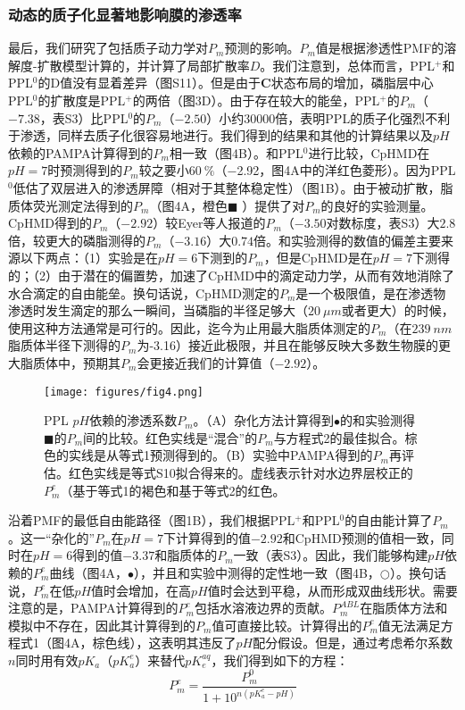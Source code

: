 \documentclass[journal=,manuscript=artical,email=false]{achemso}
\begin{document}
\subsubsection{动态的质子化显著地影响膜的渗透率}
最后，我们研究了包括质子动力学对$P_m$预测的影响。$P_m$值是根据渗透性PMF的溶解度-扩散模型计算的，并计算了局部扩散率$D$。我们注意到，总体而言，PPL$^{+}$和PPL$^{0}$的D值没有显着差异（图S11）。但是由于\textbf{C}状态布局的增加，磷脂层中心PPL$^{0}$的扩散度是PPL$^{+}$的两倍（图3D）。由于存在较大的能垒，PPL$^{+}$的$P_m$（$−7.38$，表S3）比PPL$^{0}$的$P_m$（$−2.50$）小约$30000$倍，表明PPL的质子化强烈不利于渗透，同样去质子化很容易地进行。我们得到的结果和其他的计算结果以及$pH$依赖的PAMPA计算得到的$P_m$相一致（图4B）。和PPL$^{0}$进行比较，CpHMD在$pH=7$时预测得到的$P_m$较之要小$60 ~\%$（−2.92，图4A中的洋红色菱形）。因为PPL$^{0}$低估了双层进入的渗透屏障（相对于其整体稳定性）（图1B）。由于被动扩散，脂质体荧光测定法得到的$P_m$（图4A，橙色$\blacksquare$ ）提供了对$P_m$的良好的实验测量。CpHMD得到的$P_m$（$-2.92$）较Eyer等人报道的$P_m$（$-3.50 对数标度$，表S3）大$2.8$倍，较更大的磷脂测得的$P_m$（$-3.16$）大$0.74$倍。和实验测得的数值的偏差主要来源以下两点：（1）实验是在$pH=6$下测到的$P_m$，但是CpHMD是在$pH=7$下测得的；（2）由于潜在的偏置势，加速了CpHMD中的滴定动力学，从而有效地消除了水合滴定的自由能垒。换句话说，CpHMD测定的$P_m$是一个极限值，是在渗透物渗透时发生滴定的那么一瞬间，当磷脂的半径足够大（$20~\mu m或者更大$）的时候，使用这种方法通常是可行的。因此，迄今为止用最大脂质体测定的$P_m$（在$239~nm$脂质体半径下测得的$P_m$为-3.16）接近此极限，并且在能够反映大多数生物膜的更大脂质体中，预期其$P_m$会更接近我们的计算值（$-2.92$）。

\begin{figure}[h]
\centering
\texttt{[image: figures/fig4.png]}
\caption{PPL $pH$依赖的渗透系数$P_m$。（A）杂化方法计算得到$\bullet$的和实验测得$\blacksquare$的$P_m$间的比较。红色实线是“混合”的$P_m$与方程式2的最佳拟合。棕色的实线是从等式1预测得到的。（B）实验中PAMPA得到的$P_m$再评估。红色实线是等式S10拟合得来的。虚线表示针对水边界层校正的$P^{e}_{m}$（基于等式1的褐色和基于等式2的红色。}
\label{fig:fig4}
\end{figure}


沿着PMF的最低自由能路径（图1B），我们根据PPL$^{+}$和PPL$^{0}$的自由能计算了$P_m$。这一“杂化的”$P_m$在$pH=7$下计算得到的值$-2.92$和CpHMD预测的值相一致，同时在$pH=6$得到的值$-3.37$和脂质体的$P_m$一致（表S3）。因此，我们能够构建$pH$依赖的$P^e_m$曲线（图4A，$\bullet$），并且和实验中测得的定性地一致（图4B，$\bigcirc$）。换句话说，$P^e_m$在低$pH$值时会增加，在高$pH$值时会达到平稳，从而形成双曲线形状。需要注意的是，PAMPA计算得到的$P^e_m$包括水溶液边界的贡献。$P^{ABL}_m$在脂质体方法和模拟中不存在，因此其计算得到的$P_m$值可直接比较。计算得出的$P^e_m$值无法满足方程式1（图4A，棕色线），这表明其违反了$pH$配分假设。但是，通过考虑希尔系数$n$同时用有效$pK_a$（$pK^e_a$）来替代$pK^{aq}_e$，我们得到如下的方程：
\begin{equation}
P^e_{m} = \frac{P^0_m}{1+10^{n(pK^e_a-pH)}}
\end{equation}
\end{document}
